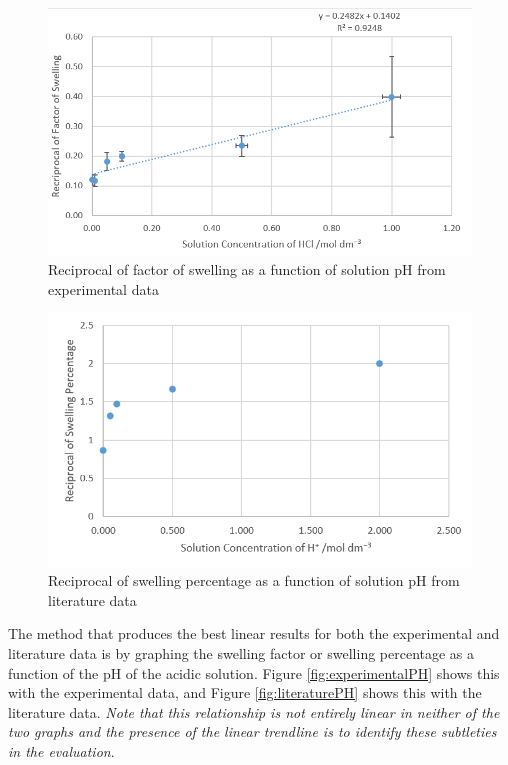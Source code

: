 \documentclass[11pt, letterpaper]{article}
\begin{document}
\begin{paracol}{2}
    \begin{figure}[H]
        \centering
        \includegraphics[width=\linewidth]{reciprocalLinearization.png}
        \caption{Reciprocal of factor of swelling as a function of solution pH from experimental data}
        \label{fig:reciprocalLinearization}
    \end{figure}
    \switchcolumn
    \begin{figure}[H]
        \centering
        \includegraphics[width=\linewidth]{reciprocalLiterature.png}
        \caption{Reciprocal of swelling percentage as a function of solution pH from literature data \protect\cite{ramavaraprasadSwellingCharacteristicsSoils2018a}}
        \label{fig:reciprocalLiterature}
    \end{figure}
\end{paracol}


The method that produces the best linear results for both the experimental and literature data is by graphing
the swelling factor or swelling percentage as a function of
the pH of the acidic solution. Figure \ref*{fig:experimentalPH} shows this with the experimental
data, and Figure \ref*{fig:literaturePH} shows this with the literature data.
\textit{Note that this relationship is not entirely linear in neither of the
    two graphs and the presence of the linear trendline is to identify these subtleties
    in the evaluation}.
\end{document}

